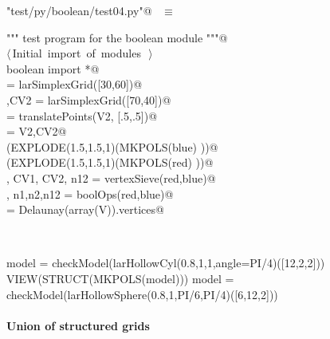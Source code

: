 \documentclass[11pt,oneside]{article}	%
\begin{document}
\begin{flushleft} \small
\begin{minipage}{\linewidth} \label{scrap24}
\verb@"test/py/boolean/test04.py"@\nobreak\ {\footnotesize {} }$\equiv$
\vspace{-1ex}
\begin{list}{}{} \item
\mbox{}\verb@""" test program for the boolean module """@\\
\mbox{}\verb@@\hbox{$\langle\,$Initial import of modules\nobreak\ {\footnotesize {}}$\,\rangle$}\verb@@\\
\mbox{}\verb@from boolean import *@\\
\mbox{}\verb@blue = larSimplexGrid([30,60])@\\
\mbox{},CV2 = larSimplexGrid([70,40])@\\
\mbox{} = translatePoints(V2, [.5,.5])@\\
\mbox{}\verb@red = V2,CV2@\\
\mbox{}\verb@VIEW(EXPLODE(1.5,1.5,1)(MKPOLS(blue) ))@\\
\mbox{}\verb@VIEW(EXPLODE(1.5,1.5,1)(MKPOLS(red) ))@\\
\mbox{}\verb@V, CV1, CV2, n12 = vertexSieve(red,blue)@\\
\mbox{}\verb@V, n1,n2,n12 = boolOps(red,blue)@\\
\mbox{}\verb@CV = Delaunay(array(V)).vertices@\\
\mbox{}\verb@@{\NWsep}
\end{list}
\vspace{-2ex}
\end{minipage}\\[4ex]
\end{flushleft}


model = checkModel(larHollowCyl(0.8,1,1,angle=PI/4)([12,2,2]))
VIEW(STRUCT(MKPOLS(model)))
model = checkModel(larHollowSphere(0.8,1,PI/6,PI/4)([6,12,2]))


\paragraph{Union of structured grids}
\end{document}
